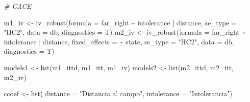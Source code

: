 \documentclass[
  12pt,
  a4paper,
]{article}
\newenvironment{Shaded}{\begin{snugshade}}{\end{snugshade}}
\newcommand{\AttributeTok}[1]{\textcolor[rgb]{0.77,0.63,0.00}{#1}}
\newcommand{\CommentTok}[1]{\textcolor[rgb]{0.56,0.35,0.01}{\textit{#1}}}
\newcommand{\FunctionTok}[1]{\textcolor[rgb]{0.00,0.00,0.00}{#1}}
\newcommand{\NormalTok}[1]{#1}
\newcommand{\OtherTok}[1]{\textcolor[rgb]{0.56,0.35,0.01}{#1}}
\newcommand{\SpecialCharTok}[1]{\textcolor[rgb]{0.00,0.00,0.00}{#1}}
\newcommand{\StringTok}[1]{\textcolor[rgb]{0.31,0.60,0.02}{#1}}
\begin{document}
\begin{Shaded}
\begin{Highlighting}[]
\CommentTok{\# CACE}

\NormalTok{m1\_iv }\OtherTok{\textless{}{-}} \FunctionTok{iv\_robust}\NormalTok{(}\AttributeTok{formula =}\NormalTok{ far\_right }\SpecialCharTok{\textasciitilde{}}\NormalTok{ intolerance }\SpecialCharTok{|}\NormalTok{ distance, }
                   \AttributeTok{se\_type =} \StringTok{"HC2"}\NormalTok{,}
                   \AttributeTok{data =}\NormalTok{ db, }
                   \AttributeTok{diagnostics =}\NormalTok{ T)}
\NormalTok{m2\_iv }\OtherTok{\textless{}{-}} \FunctionTok{iv\_robust}\NormalTok{(}\AttributeTok{formula =}\NormalTok{ far\_right }\SpecialCharTok{\textasciitilde{}}\NormalTok{ intolerance }\SpecialCharTok{|}\NormalTok{ distance,}
                   \AttributeTok{fixed\_effects =} \SpecialCharTok{\textasciitilde{}}\NormalTok{ state,}
                   \AttributeTok{se\_type =} \StringTok{"HC2"}\NormalTok{,}
                   \AttributeTok{data =}\NormalTok{ db,}
                   \AttributeTok{diagnostics =}\NormalTok{ T)}

\NormalTok{models1 }\OtherTok{\textless{}{-}} \FunctionTok{list}\NormalTok{(m1\_ittd, m1\_itt, m1\_iv)}
\NormalTok{models2 }\OtherTok{\textless{}{-}} \FunctionTok{list}\NormalTok{(m2\_ittd, m2\_itt, m2\_iv)}


\NormalTok{ccoef }\OtherTok{\textless{}{-}} \FunctionTok{list}\NormalTok{(}
  \AttributeTok{distance =} \StringTok{"Distancia al campo"}\NormalTok{,}
  \AttributeTok{intolerance =} \StringTok{"Intolerancia"}\NormalTok{)}


\end{Highlighting}
\end{Shaded}
\end{document}
